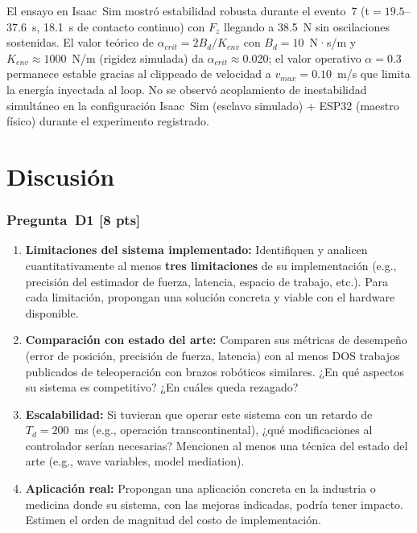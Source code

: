 \documentclass[journal,10pt,twoside]{IEEEtran}
\newcommand{\pts}[1]{\textcolor{tec_red}{\textbf{[#1 pts]}}}
\begin{document}
El ensayo en Isaac~Sim mostró estabilidad robusta durante el evento~7
(t$=19.5$--$37.6$~s, 18.1~s de contacto continuo) con $F_z$ llegando a
38.5~N sin oscilaciones sostenidas. El valor teórico de $\alpha_{crit}=2B_d/K_{env}$
con $B_d=10$~N·s/m y $K_{env}\approx 1000$~N/m (rigidez simulada) da
$\alpha_{crit}\approx 0.020$; el valor operativo $\alpha=0.3$ permanece estable
gracias al clippeado de velocidad a $v_{max}=0.10$~m/s que limita la energía
inyectada al loop. No se observó acoplamiento de inestabilidad simultáneo en
la configuración Isaac~Sim (esclavo simulado) + ESP32 (maestro físico) durante
el experimento registrado.

\section{Discusión}
\label{sec:discussion}

\subsubsection*{Pregunta~D1 \pts{8}}
\begin{enumerate}[label=(\alph*)]
  \item \textbf{Limitaciones del sistema implementado:}
        Identifiquen y analicen cuantitativamente al menos \textbf{tres
        limitaciones} de su implementación (e.g., precisión del
        estimador de fuerza, latencia, espacio de trabajo, etc.).
        Para cada limitación, propongan una solución concreta y
        viable con el hardware disponible.
  \item \textbf{Comparación con estado del arte:}
        Comparen sus métricas de desempeño (error de posición,
        precisión de fuerza, latencia) con al menos DOS trabajos
        publicados de teleoperación con brazos robóticos similares.
        ¿En qué aspectos su sistema es competitivo? ¿En cuáles
        queda rezagado?
  \item \textbf{Escalabilidad:} Si tuvieran que operar este sistema
        con un retardo de $T_d = 200$~ms (e.g., operación
        transcontinental), ¿qué modificaciones al controlador
        serían necesarias? Mencionen al menos una técnica
        del estado del arte (e.g., wave variables, model mediation).
  \item \textbf{Aplicación real:} Propongan una aplicación concreta
        en la industria o medicina donde su sistema, con las mejoras
        indicadas, podría tener impacto. Estimen el orden de magnitud
        del costo de implementación.
\end{enumerate}
\end{document}
